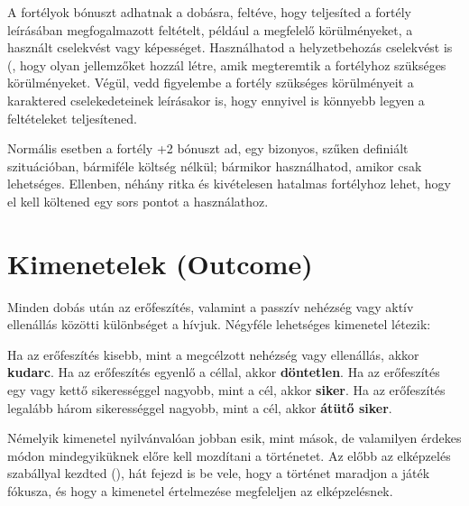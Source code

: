 A fortélyok bónuszt adhatnak a dobásra, feltéve, hogy teljesíted a fortély leírásában megfogalmazott feltételt, például a megfelelő körülményeket, a használt cselekvést vagy képességet. Használhatod a helyzetbehozás cselekvést is (, hogy olyan jellemzőket hozzál létre, amik megteremtik a fortélyhoz szükséges körülményeket. Végül, vedd figyelembe a fortély szükséges körülményeit a karaktered cselekedeteinek leírásakor is, hogy ennyivel is könnyebb legyen a feltételeket teljesítened.

Normális esetben a fortély +2 bónuszt ad, egy bizonyos, szűken definiált szituációban, bármiféle költség nélkül; bármikor használhatod, amikor csak lehetséges. Ellenben, néhány ritka és kivételesen hatalmas fortélyhoz lehet, hogy el kell költened egy sors pontot a használathoz.

\label{Kimenetelek}
\section[Kimenetelek]{Kimenetelek (Outcome)}

Minden dobás után az erőfeszítés, valamint a passzív nehézség vagy aktív ellenállás közötti különbséget a  hívjuk. Négyféle lehetséges kimenetel létezik:

\begin{itemize}
    \failureitem Ha az erőfeszítés kisebb, mint a megcélzott nehézség vagy ellenállás, akkor \textbf{kudarc}.
    \tieitem Ha az erőfeszítés egyenlő a céllal, akkor \textbf{döntetlen}.
    \successitem Ha az erőfeszítés egy vagy kettő sikerességgel nagyobb, mint a cél, akkor \textbf{siker}.
    \successwithstyleitem Ha az erőfeszítés legalább három sikerességgel nagyobb, mint a cél, akkor \textbf{átütő siker}.
\end{itemize}

Némelyik kimenetel nyilvánvalóan jobban esik, mint mások, de valamilyen érdekes módon mindegyiküknek előre kell mozdítani a történetet. Az előbb az elképzelés szabállyal kezdted (), hát fejezd is be vele, hogy a történet maradjon a játék fókusza, és hogy a kimenetel értelmezése megfeleljen az elképzelésnek.


\newpage

